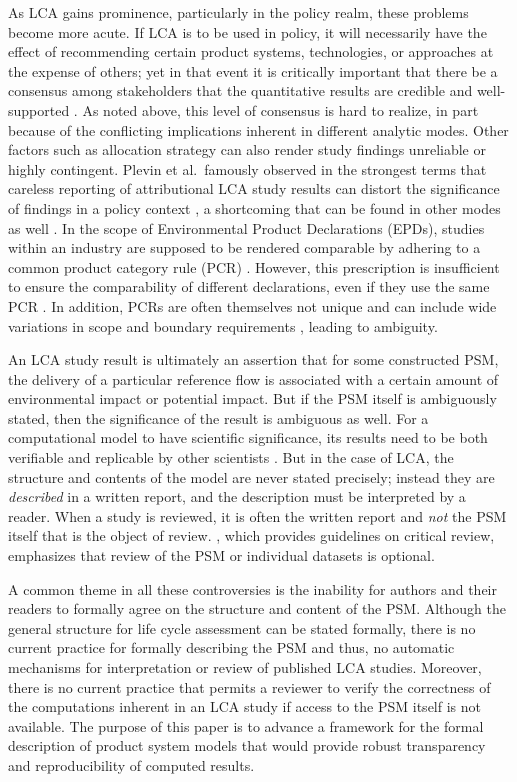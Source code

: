 As LCA gains prominence, particularly in the policy realm, these problems become more acute.  If LCA is to be used in policy, it will necessarily have the effect of recommending certain product systems, technologies, or approaches at the expense of others; yet in that event it is critically important that there be a consensus among stakeholders that the quantitative results are credible and well-supported \citep{Rainville_2015, McManus_2015}.  As noted above, this level of consensus is hard to realize, in part because of the conflicting implications inherent in different analytic modes.
Other factors such as allocation strategy \citep{Pelletier_2014} can also render study findings unreliable or highly contingent.  Plevin et al.\ famously observed in the strongest terms that careless reporting of attributional LCA study results can distort the significance of findings in a policy context \citep{Plevin_2013}, a shortcoming that can be found in other modes as well \citep{Brandao_2014}.  In the scope of Environmental Product Declarations (EPDs), studies within an industry are supposed to be rendered comparable by adhering to a common product category rule (PCR) \citep{Fet_2006}.  However, this prescription is insufficient to ensure the comparability of different declarations, even if they use the same PCR \citep{Modahl_2012}.  In addition, PCRs are often themselves not unique and can include wide variations in scope and boundary requirements \citep{Subramanian_2012}, leading to ambiguity.  

An LCA study result is ultimately an assertion that for some constructed PSM, the delivery of a particular reference flow is associated with a certain amount of environmental impact or potential impact.  But if the PSM itself is ambiguously stated, then the significance of the result is ambiguous as well.  For a computational model to have scientific significance, its results need to be both verifiable and replicable by other scientists \citep{Fomel_2009, Mesirov_2010}.  But in the case of LCA, the structure and contents of the model are never stated precisely; instead they are \emph{described} in a written report, and the description must be interpreted by a reader.  When a study is reviewed, it is often the written report and \emph{not} the PSM itself that is the object of review.  \cite{iso14071}, which provides guidelines on critical review, emphasizes that review of the PSM or individual datasets is optional.  

A common theme in all these controversies is the inability for authors and their readers to formally agree on the structure and content of the PSM.  Although the general structure for life cycle assessment can be stated formally, there is no current practice for formally describing the PSM and thus, no automatic mechanisms for interpretation or review of published LCA studies.  Moreover, there is no current practice that permits a reviewer to verify the correctness of the computations inherent in an LCA study if access to the PSM itself is not available.  The purpose of this paper is to advance a framework for the formal description of product system models that would provide robust transparency and reproducibility of computed results. 

